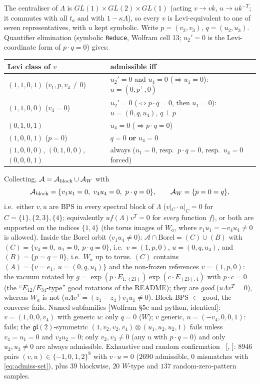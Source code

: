 The centraliser of $\Lambda$ is $GL(1)\times GL(2)\times GL(1)$ (acting $v\to vk$, $u\to uk^{-T}$; it commutes with all $t_a$ and with $1-\kappa\Lambda$), so every $v$ is Levi-equivalent to one of seven representatives, with $u$ kept symbolic. Write $p=(v_2,v_3)$, $q=(u_2,u_3)$.
Quantifier elimination (symbolic \texttt{Reduce}, Wolfram cell 13; $u_2'=0$ is the Levi-coordinate form of $p\cdot q=0$) gives:
\begin{center}
\begin{tabular}{ll}
\toprule
Levi class of $v$ & admissible iff\\
\midrule
$(1,1,0,1)$ ($v_1,p,v_4\ne0$) & $u_2'=0$ and $u_4=0$ ($\Rightarrow u_1=0$): $u=(0,p^\perp,0)$\\
$(1,1,0,0)$ ($v_4=0$) & $u_2'=0$ ($\Leftrightarrow p\cdot q=0$, then $u_1=0$): $u=(0,q,u_4)$, $q\perp p$\\
$(0,1,0,1)$ & $u_4=0$ ($\Rightarrow p\cdot q=0$)\\
$(1,0,0,1)$ ($p=0$) & $q=0$ \textbf{or} $u_4=0$\\
$(1,0,0,0)$, $(0,1,0,0)$, $(0,0,0,1)$ & always ($u_1=0$, resp.\ $p\cdot q=0$, resp.\ $u_4=0$ forced)\\
\bottomrule
\end{tabular}
\end{center}
Collecting, $\mathcal A=\mathcal A_{\rm block}\cup\mathcal A_W$ with
\begin{equation}\label{eq:admiss-set}
 \mathcal A_{\rm block}=\{v_1u_1=0,\ v_4u_4=0,\ p\cdot q=0\},\qquad \mathcal A_W=\{p=0=q\},
\end{equation}
i.e.\ either $v,u$ are BPS in every spectral block of $\Lambda$ ($v|_C\cdot u|_C=0$ for $C=\{1\},\{2,3\},\{4\}$; equivalently $u f(\Lambda)v^T=0$ for \emph{every} function $f$), or both are supported on the indices $\{1,4\}$ (the torus images of $W_a$, where $v_1u_1=-v_4u_4\ne0$ is allowed).
Inside the Borel orbit ($v_1u_4\ne0$): $\mathcal A\cap\mathrm{Borel}=(C)\cup(B)$ with $(C)=\{v_4=0,\ u_1=0,\ p\cdot q=0\}$, i.e.\ $v=(1,p,0)$, $u=(0,q,u_4)$, and $(B)=\{p=q=0\}$, i.e.\ $W_a$ up to torus. $(C)$ contains $(A)=\{v=e_1,\ u=(0,q,u_4)\}$ and the non-frozen references $v=(1,p,0)$:
the vacuum rotated by $g=\exp(p\cdot E_{1,(23)})\exp(c\cdot E_{(23),4})$ with $p\cdot c=0$ (the ``$E_{12}/E_{34}$-type'' good rotations of the README); they are \emph{good} ($u\Lambda v^T=0$), whereas $W_a$ is not ($u\Lambda v^T=(z_1-z_4)v_1u_1\ne0$). Block-BPS $\subset$ good, the converse fails.
Named subfamilies [Wolfram \S5c and python, identical]: $v=(1,0,0,v_4)$ with generic $u$: only $q=0$ ($W$); $v$ generic, $u=(-v_4,0,0,1)$: fails; the $\mathfrak{gl}(2)$-symmetric $(1,v_2,v_2,v_4)\otimes(u_1,u_2,u_2,1)$ fails unless $v_4=u_1=0$ and $v_2u_2=0$;
only $v_2,v_3\ne0$ (any $u$ with $p\cdot q=0$) and only $u_2,u_3\ne0$ are always admissible. Exhaustive and random confirmation \npy\ [, ]: $8946$ pairs $(v,u)\in\{-1,0,1,2\}^8$ with $v\cdot u=0$ ($2690$ admissible, $0$ mismatches with \eqref{eq:admiss-set}), plus $39$ blockwise, $20$ $W$-type and $137$ random-zero-pattern samples.

